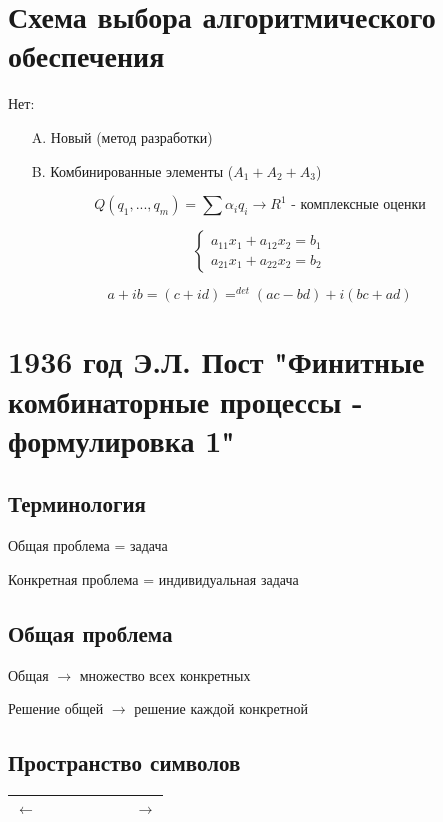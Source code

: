 \documentclass[a4paper, 14pt]{report}
\begin{document}
\chapter{Схема выбора алгоритмического обеспечения}

Нет:

\begin{enumerate}
    \item[A.] Новый (метод разработки)
    \item[B.] Комбинированные элементы ($A_1 + A_2 + A_3$)
\end{enumerate}

$$ Q(q_1,...,q_m) = \sum \alpha_i q_i \to R^1 \text{ - комплексные оценки}$$

$$
\begin{cases}
    a_{11} x_1 + a_{12} x_2 = b_1 \\
    a_{21} x_1 + a_{22} x_2 = b_2
\end{cases}
$$

$$ a + ib = (c + id) = ^{det} (ac - bd) + i (bc + ad) $$

\chapter{1936 год Э.Л. Пост "Финитные комбинаторные процессы - формулировка 1"}

\section{Терминология}

Общая проблема = задача

Конкретная проблема = индивидуальная задача

\section{Общая проблема}

Общая $\to$ множество всех конкретных

Решение общей $\to$ решение каждой конкретной

\section{Пространство символов}

\begin{tabular}{c|c|c|c|c|c|c|c}
    \hline
    $\leftarrow$ & & & & & & & $\to$ \\
    \hline
\end{tabular}
\end{document}
